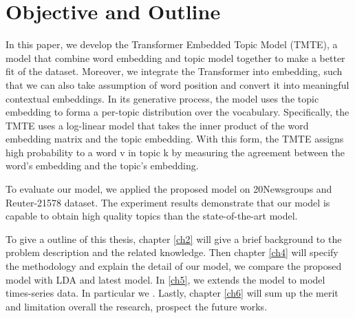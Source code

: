 \section{Objective and Outline}\label{ch1:4}
In this paper, we develop the Transformer Embedded Topic Model (TMTE), a model that combine word embedding and topic model together to make a better fit of the dataset. Moreover, we integrate the Transformer into embedding, such that we can also take assumption of word position and convert it into meaningful contextual embeddings. 
In its generative process, the model uses the topic embedding to forma a per-topic distribution over the vocabulary. Specifically, the TMTE uses a log-linear model that takes the inner product of the word embedding matrix and the topic embedding.
With this form, the TMTE assigns high probability to a word v in topic k by measuring the agreement between the word’s embedding and the topic’s embedding.

To evaluate our model, we applied the proposed model on 20Newsgroups and Reuter-21578 dataset. The experiment results demonstrate that our model is capable to obtain high quality topics than the state-of-the-art model. 

To give a outline of this thesis, chapter \ref{ch2} will give a brief background to the problem description and the related knowledge. 
Then chapter \ref{ch4} will specify the methodology and explain the detail of our model, we compare the proposed model with LDA and latest model. 
In \ref{ch5}, we extends the model to model times-series data. In particular we . 
Lastly, chapter \ref{ch6} will sum up the merit and limitation overall the research, prospect the future works.